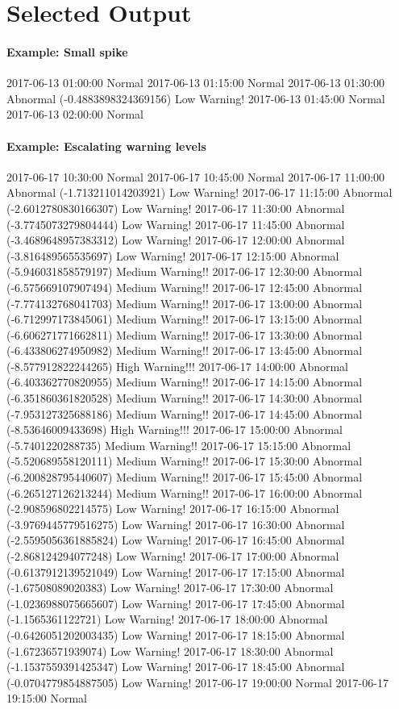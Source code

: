 \documentclass[11pt]{article}
\begin{document}
    \section{Selected Output}\label{selected-output}

\paragraph{Example: Small spike}\label{example-small-spike}

2017-06-13 01:00:00 Normal 2017-06-13 01:15:00 Normal 2017-06-13
01:30:00 Abnormal (-0.4883898324369156) Low Warning! 2017-06-13 01:45:00
Normal 2017-06-13 02:00:00 Normal

\paragraph{Example: Escalating warning
levels}\label{example-escalating-warning-levels}

2017-06-17 10:30:00 Normal 2017-06-17 10:45:00 Normal 2017-06-17
11:00:00 Abnormal (-1.713211014203921) Low Warning! 2017-06-17 11:15:00
Abnormal (-2.6012780830166307) Low Warning! 2017-06-17 11:30:00 Abnormal
(-3.7745073279804444) Low Warning! 2017-06-17 11:45:00 Abnormal
(-3.4689648957383312) Low Warning! 2017-06-17 12:00:00 Abnormal
(-3.816489565535697) Low Warning! 2017-06-17 12:15:00 Abnormal
(-5.946031858579197) Medium Warning!! 2017-06-17 12:30:00 Abnormal
(-6.575669107907494) Medium Warning!! 2017-06-17 12:45:00 Abnormal
(-7.774132768041703) Medium Warning!! 2017-06-17 13:00:00 Abnormal
(-6.712997173845061) Medium Warning!! 2017-06-17 13:15:00 Abnormal
(-6.606271771662811) Medium Warning!! 2017-06-17 13:30:00 Abnormal
(-6.433806274950982) Medium Warning!! 2017-06-17 13:45:00 Abnormal
(-8.577912822244265) High Warning!!! 2017-06-17 14:00:00 Abnormal
(-6.403362770820955) Medium Warning!! 2017-06-17 14:15:00 Abnormal
(-6.351860361820528) Medium Warning!! 2017-06-17 14:30:00 Abnormal
(-7.953127325688186) Medium Warning!! 2017-06-17 14:45:00 Abnormal
(-8.53646009433698) High Warning!!! 2017-06-17 15:00:00 Abnormal
(-5.7401220288735) Medium Warning!! 2017-06-17 15:15:00 Abnormal
(-5.520689558120111) Medium Warning!! 2017-06-17 15:30:00 Abnormal
(-6.200828795440607) Medium Warning!! 2017-06-17 15:45:00 Abnormal
(-6.265127126213244) Medium Warning!! 2017-06-17 16:00:00 Abnormal
(-2.908596802214575) Low Warning! 2017-06-17 16:15:00 Abnormal
(-3.9769445779516275) Low Warning! 2017-06-17 16:30:00 Abnormal
(-2.5595056361885824) Low Warning! 2017-06-17 16:45:00 Abnormal
(-2.868124294077248) Low Warning! 2017-06-17 17:00:00 Abnormal
(-0.6137912139521049) Low Warning! 2017-06-17 17:15:00 Abnormal
(-1.67508089020383) Low Warning! 2017-06-17 17:30:00 Abnormal
(-1.0236988075665607) Low Warning! 2017-06-17 17:45:00 Abnormal
(-1.1565361122721) Low Warning! 2017-06-17 18:00:00 Abnormal
(-0.6426051202003435) Low Warning! 2017-06-17 18:15:00 Abnormal
(-1.67236571939074) Low Warning! 2017-06-17 18:30:00 Abnormal
(-1.1537559391425347) Low Warning! 2017-06-17 18:45:00 Abnormal
(-0.0704779854887505) Low Warning! 2017-06-17 19:00:00 Normal 2017-06-17
19:15:00 Normal 
\end{document}
